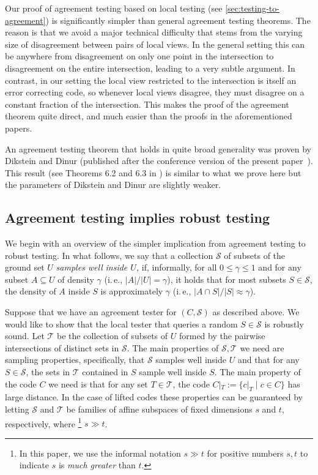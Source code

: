\documentclass[11pt]{article}
\numberwithin{equation}{section}
\theoremstyle{definition}
\theoremstyle{plain}
\newcommand{\ie}{i.\,e.}
\theoremstyle{plain}
\newcommand{\calT}{{\mathcal{T}}}
\newcommand{\calS}{{\mathcal{S}}}
\begin{document}
Our proof of agreement testing based on local testing (see \cref{sec:testing-to-agreement}) is significantly simpler than general agreement testing theorems. The reason is that we avoid a major technical difficulty that stems from the varying size of disagreement between pairs of local views. In the general setting this can be anywhere from disagreement on only one point in the intersection to disagreement on the entire intersection, leading to a very subtle argument. In contrast, in our setting the local view restricted to the intersection is itself an error correcting code, so whenever  local views disagree, they must disagree on a %
constant  %
fraction of the intersection. This makes the proof of the agreement theorem %
quite  %
direct, and much easier than the proofs in
the  %
aforementioned %
papers.  %

%
%
An agreement  %
testing theorem that holds in quite broad generality 
was proven by Dikstein and Dinur \cite{DiksteinD2019} 
(published after the %
conference version of the present paper~\cite{conf-version}).
%
%
This result (see Theorems 6.2 and 6.3 in %
\cite{DiksteinD2019}) is   %
%
similar to what we prove here but the parameters of Dikstein and Dinur are slightly weaker.
%
%

\subsection{Agreement testing implies robust testing}

We begin with an overview of the simpler implication from agreement
testing to robust testing. In what follows, we say that a
collection %
$\calS$ of subsets %
of the ground set $U$ \emph{samples well}
%
%
%
%
%
%
\emph{inside $U$,}   %
if, informally,
for all $0\le \gamma\le 1$ and %
%
%
for any subset $A \subseteq U$ of density $\gamma$ (\ie, $|A|/|U| = \gamma$),
it holds that for most subsets $S \in \calS$, the density of $A$ inside $S$
is approximately $\gamma$
%
(\ie, $|A\cap S| /|S| \approx \gamma$). %
%

Suppose that we have an agreement tester for  %
$(C, \calS)$   %
as described above. We would like to show that the local tester that 
queries a random $S \in \calS$ is robustly sound.
Let $\calT$ be the collection of subsets of $U$ formed by
the %
%
pairwise intersections of
distinct  %
%
sets in $\calS$.
%
%
%
The main properties
%
of $\calS, \calT$ we need    %
are sampling properties, 
specifically, that $\calS$ samples well
%
inside $U$   %
and that for any $S \in \calS$, %
the sets  %
in $\calT$ contained in $S$ sample well 
%
inside $S$.   %
 The main property %
of the code $C$
we need  %
is that for any set $T \in \calT$, the code $C|_T:=\{c|_T \mid c\in C\}$
has large distance.  %
In the case of lifted codes these properties can be guaranteed by letting 
%
$\calS$ and $\calT$  %
be families of affine subspaces of fixed dimensions
%
$s$ and $t$,  %
respectively, where%
%
%
%
%
\footnote{In this paper, we use the informal notation $s \gg t$
for positive numbers $s,t$ to indicate $s$ is \emph{much greater}
than $t$.}   %
$s \gg t$.
\end{document}
